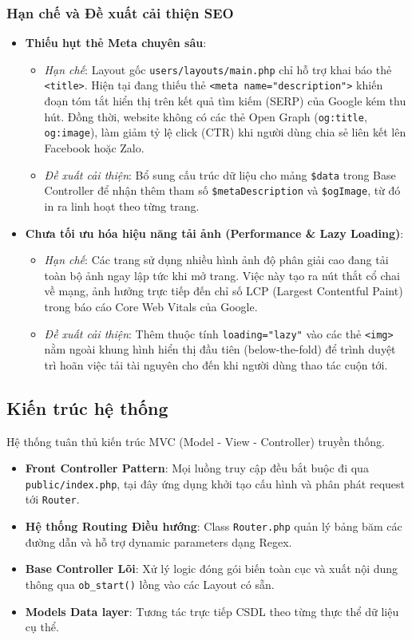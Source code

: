 \documentclass[pt = 12,a4paper]{article}
\begin{document}
\subsubsection{Hạn chế và Đề xuất cải thiện SEO}
\begin{itemize}
    \item \textbf{Thiếu hụt thẻ Meta chuyên sâu}:
    \begin{itemize}
        \item \textit{Hạn chế}: Layout gốc \texttt{users/layouts/main.php} chỉ hỗ trợ khai báo thẻ \texttt{<title>}. Hiện tại đang thiếu thẻ \texttt{<meta name="description">} khiến đoạn tóm tắt hiển thị trên kết quả tìm kiếm (SERP) của Google kém thu hút. Đồng thời, website không có các thẻ Open Graph (\texttt{og:title}, \texttt{og:image}), làm giảm tỷ lệ click (CTR) khi người dùng chia sẻ liên kết lên Facebook hoặc Zalo.
        \item \textit{Đề xuất cải thiện}: Bổ sung cấu trúc dữ liệu cho mảng \texttt{\$data} trong Base Controller để nhận thêm tham số \texttt{\$metaDescription} và \texttt{\$ogImage}, từ đó in ra linh hoạt theo từng trang.
    \end{itemize}
    \item \textbf{Chưa tối ưu hóa hiệu năng tải ảnh (Performance \& Lazy Loading)}:
    \begin{itemize}
        \item \textit{Hạn chế}: Các trang sử dụng nhiều hình ảnh độ phân giải cao đang tải toàn bộ ảnh ngay lập tức khi mở trang. Việc này tạo ra nút thắt cổ chai về mạng, ảnh hưởng trực tiếp đến chỉ số LCP (Largest Contentful Paint) trong báo cáo Core Web Vitals của Google.
        \item \textit{Đề xuất cải thiện}: Thêm thuộc tính \texttt{loading="lazy"} vào các thẻ \texttt{<img>} nằm ngoài khung hình hiển thị đầu tiên (below-the-fold) để trình duyệt trì hoãn việc tải tài nguyên cho đến khi người dùng thao tác cuộn tới.
    \end{itemize}
\end{itemize}

\subsection{Kiến trúc hệ thống}
Hệ thống tuân thủ kiến trúc MVC (Model - View - Controller) truyền thống.
\begin{itemize}
    \item \textbf{Front Controller Pattern}: Mọi luồng truy cập đều bắt buộc đi qua \texttt{public/index.php}, tại đây ứng dụng khởi tạo cấu hình và phân phát request tới \texttt{Router}.
    \item \textbf{Hệ thống Routing Điều hướng}: Class \texttt{Router.php} quản lý bảng băm các đường dẫn và hỗ trợ dynamic parameters dạng Regex.
    \item \textbf{Base Controller Lõi}: Xử lý logic đóng gói biến toàn cục và xuất nội dung thông qua \texttt{ob\_start()} lồng vào các Layout có sẵn.
    \item \textbf{Models Data layer}: Tương tác trực tiếp CSDL theo từng thực thể dữ liệu cụ thể.
\end{itemize}
\end{document}
